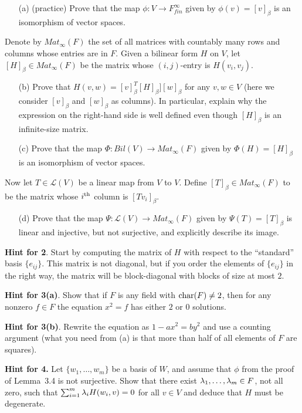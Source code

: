\documentclass[12pt]{amsart}
\begin{document}
\begin{itemize}
\item[(a)] (practice) Prove that the map $\phi:V\to F^{\infty}_{fin}$ given by $\phi(v)=[v]_{\beta}$ is an isomorphism of vector spaces.
\end{itemize}

Denote by $Mat_{\infty}(F)$ the set of all matrices with countably many rows and columns whose entries are in $F$.
Given a bilinear form $H$ on $V$, let $[H]_{\beta}\in Mat_{\infty}(F)$ be the matrix whose $(i,j)$-entry is $H(v_i,v_j)$.

\begin{itemize}
\item[(b)] Prove that $H(v,w)=[v]_{\beta}^T [H]_{\beta}] [w]_{\beta}$ for any $v,w\in V$ (here we consider $[v]_{\beta}$ and $[w]_{\beta}$ as columns). In particular, explain why the expression on the right-hand side is well defined even though $[H]_{\beta}$ is an infinite-size matrix. 
\item[(c)] Prove that the map $\Phi: Bil(V)\to Mat_{\infty}(F)$ given by $\Phi(H)=[H]_{\beta}$ is an isomorphism of vector spaces.
\end{itemize}

Now let $T\in\mathcal L(V)$ be a linear map from $V$ to $V$. Define $[T]_{\beta}\in Mat_{\infty}(F)$ to be the matrix whose $i^{\rm th}$ column
is $[Tv_i]_{\beta}$.

\begin{itemize}
\item[(d)] Prove that the map $\Psi: \mathcal L(V)\to Mat_{\infty}(F)$ given by $\Psi(T)=[T]_{\beta}$ is linear and injective, but not surjective, and explicitly describe its image.
\end{itemize}
\newpage
{\bf Hint for 2}. Start by computing the matrix of $H$ with respect to the ``standard'' basis $\{e_{ij}\}$. This matrix is not diagonal, but if you
order the elements of $\{e_{ij}\}$ in the right way, the matrix will be block-diagonal with blocks of size at most $2$.

\newpage
{\bf Hint for 3(a)}. Show that if $F$ is any field with ${\rm char}(F)\neq 2$, then for any nonzero $f\in F$ the equation $x^2=f$ has either $2$ or $0$ solutions.

\newpage
{\bf Hint for 3(b)}. Rewrite the equation as $1-ax^2=by^2$ and use a counting argument (what you need from (a) is that more than half of all elements of $F$ are squares). 

\newpage
{\bf Hint for 4.} Let $\{w_1,\ldots, w_m\}$ be a basis of $W$, and assume that $\phi$ from the proof of Lemma~3.4 is not surjective. Show that there
exist ${\lambda}_1,\ldots,{\lambda}_m\in F$, not all zero, such that $\sum_{i=1}^m {\lambda}_i H(w_i,v)=0$ for all $v\in V$ and deduce that $H$ must be degenerate.
\end{document}

